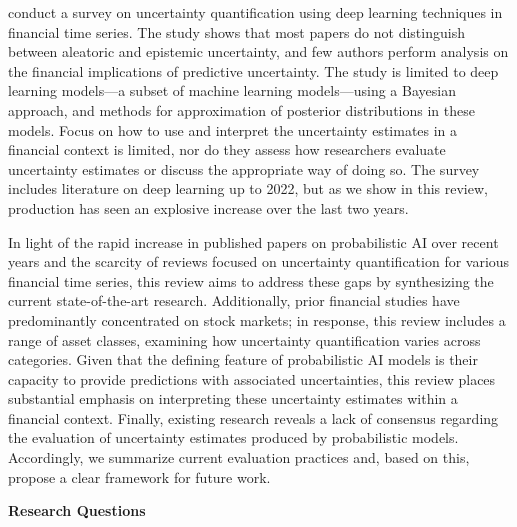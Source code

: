 \textcite{Blasco_et_al_2024} conduct a survey on uncertainty quantification using deep learning techniques in financial time series. The study shows that most papers do not distinguish between aleatoric and epistemic uncertainty, and few authors perform analysis on the financial implications of predictive uncertainty. The study is limited to deep learning models—a subset of machine learning models—using a Bayesian approach, and methods for approximation of posterior distributions in these models. Focus on how to use and interpret the uncertainty estimates in a financial context is limited, nor do they assess how researchers evaluate uncertainty estimates or discuss the appropriate way of doing so. The survey includes literature on deep learning up to 2022, but as we show in this review, production has seen an explosive increase over the last two years. 

In light of the rapid increase in published papers on probabilistic AI over recent years and the scarcity of reviews focused on uncertainty quantification for various financial time series, this review aims to address these gaps by synthesizing the current state-of-the-art research. Additionally, prior financial studies have predominantly concentrated on stock markets; in response, this review includes a range of asset classes, examining how uncertainty quantification varies across categories. Given that the defining feature of probabilistic AI models is their capacity to provide predictions with associated uncertainties, this review places substantial emphasis on interpreting these uncertainty estimates within a financial context. Finally, existing research reveals a lack of consensus regarding the evaluation of uncertainty estimates produced by probabilistic models. Accordingly, we summarize current evaluation practices and, based on this, propose a clear framework for future work. 


\textbf{Research Questions}\nopagebreak

